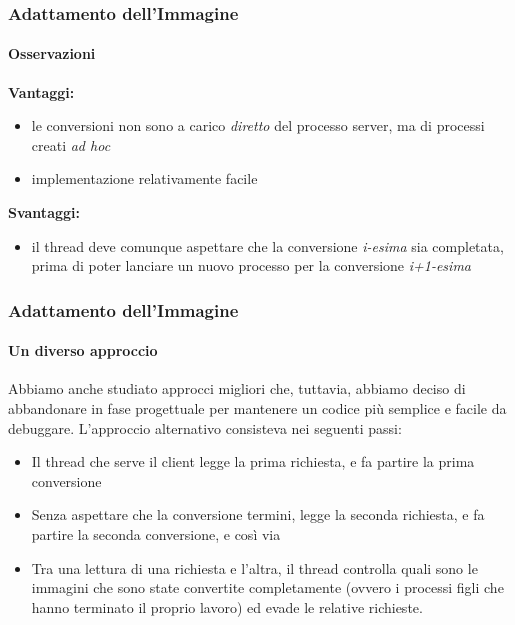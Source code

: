 \documentclass{beamer}
\begin{document}
\begin{frame}
\frametitle{Adattamento dell'Immagine}
\framesubtitle{Osservazioni}

\textbf{Vantaggi:} 
\begin{itemize}
\item le conversioni non sono a carico \textit{diretto} del processo server, ma di processi creati \textit{ad hoc}
\item implementazione relativamente facile
\end{itemize}


\medskip

\textbf{Svantaggi:} 
\begin{itemize}
\item il thread deve comunque aspettare che la conversione \textit{i-esima} sia completata, prima di poter lanciare un nuovo processo per la conversione \textit{i+1-esima}

\end{itemize}
\end{frame}

\begin{frame}
\frametitle{Adattamento dell'Immagine}
\framesubtitle{Un diverso approccio}

Abbiamo anche studiato approcci migliori che, tuttavia, abbiamo deciso di
abbandonare in fase progettuale per mantenere un codice più semplice e facile da debuggare. L'approccio alternativo consisteva nei seguenti passi:

\begin{itemize}
\item Il thread che serve il client legge la prima richiesta, e fa partire la prima conversione
\item Senza aspettare che la conversione termini, legge la seconda richiesta, e fa partire la
seconda conversione, e così via
\item Tra una lettura di una richiesta e l'altra, il thread controlla quali sono le immagini che
sono state convertite completamente (ovvero i processi figli che hanno terminato il
proprio lavoro) ed evade le relative richieste.
\
\end{itemize}

\end{frame}
\end{document}
